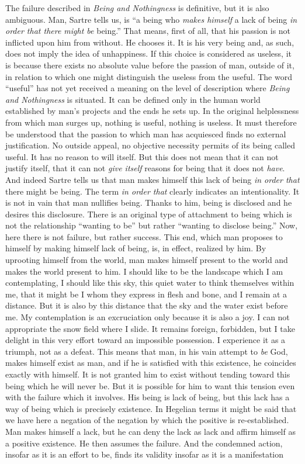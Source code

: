 \documentclass[11pt]{article}
\begin{document}
The failure described in \textit{Being and Nothingness} is definitive, but it is also ambiguous. Man, Sartre tells us, is “a being who \textit{makes himself} a lack of being \textit{in order that there might be} being.” That means, first of all, that his passion is not inflicted upon him from without. He chooses it. It is his very being and, as such, does not imply the idea of unhappiness. If this choice is considered as useless, it is because there exists no absolute value before the passion of man, outside of it, in relation to which one might distinguish the useless from the useful. The word “useful” has not yet received a meaning on the level of description where \textit{Being and Nothingness} is situated. It can be defined only in the human world established by man’s projects and the ends he sets up. In the original helplessness from which man surges up, nothing is useful, nothing is useless. It must therefore be understood that the passion to which man has acquiesced finds no external justification. No outside appeal, no objective necessity permits of its being called useful. It has no reason to will itself. But this does not mean that it can not justify itself, that it can not \textit{give itself} reasons for being that it does not \textit{have}. And indeed Sartre tells us that man makes himself this lack of being \textit{in order that} there might be being. The term \textit{in order that} clearly indicates an intentionality. It is not in vain that man nullifies being. Thanks to him, being is disclosed and he desires this disclosure. There is an original type of attachment to being which is not the relationship “wanting to be” but rather “wanting to disclose being.” Now, here there is not failure, but rather success. This end, which man proposes to himself by making himself lack of being, is, in effect, realized by him. By uprooting himself from the world, man makes himself present to the world and makes the world present to him. I should like to be the landscape which I am contemplating, I should like this sky, this quiet water to think themselves within me, that it might be I whom they express in flesh and bone, and I remain at a distance. But it is also by this distance that the sky and the water exist before me. My contemplation is an excruciation only because it is also a joy. I can not appropriate the snow field where I slide. It remains foreign, forbidden, but I take delight in this very effort toward an impossible possession. I experience it as a triumph, not as a defeat. This means that man, in his vain attempt to \textit{be} God, makes himself exist as man, and if he is satisfied with this existence, he coincides exactly with himself. It is not granted him to exist without tending toward this being which he will never be. But it is possible for him to want this tension even with the failure which it involves. His being is lack of being, but this lack has a way of being which is precisely existence. In Hegelian terms it might be said that we have here a negation of the negation by which the positive is re-established. Man makes himself a lack, but he can deny the lack as lack and affirm himself as a positive existence. He then assumes the failure. And the condemned action, insofar as it is an effort to be, finds its validity insofar as it is a manifestation 
\end{document}

